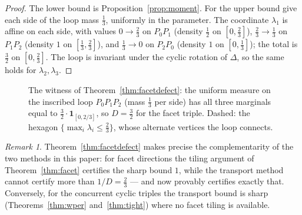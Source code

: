 \documentclass{aims}
\numberwithin{equation}{section}
\theoremstyle{plain}
\theoremstyle{definition}
\theoremstyle{remark}
\newtheorem{remark}[theorem]{Remark}
\begin{document}
\begin{proof}
The lower bound is Proposition~\ref{prop:moment}. For the upper bound give each
side of the loop mass $\tfrac13$, uniformly in the parameter. The coordinate
$\lambda_1$ is affine on each side, with values $0\to\tfrac23$ on $P_0P_1$
(density $\tfrac12$ on $[0,\tfrac23]$), $\tfrac23\to\tfrac13$ on $P_1P_2$
(density $1$ on $[\tfrac13,\tfrac23]$), and $\tfrac13\to0$ on $P_2P_0$ (density
$1$ on $[0,\tfrac13]$); the total is $\tfrac32$ on $[0,\tfrac23]$. The loop is
invariant under the cyclic rotation of $\Delta$, so the same holds for
$\lambda_2,\lambda_3$.
\end{proof}

\begin{figure}[ht]
\centering
{}
\caption{The witness of Theorem~\ref{thm:facetdefect}: the uniform measure on
the inscribed loop $P_0P_1P_2$ (mass $\tfrac13$ per side) has all three
marginals equal to $\tfrac32\cdot\mathbf1_{[0,2/3]}$, so $D=\tfrac32$ for the
facet triple. Dashed: the hexagon $\{\max_i\lambda_i\le\tfrac23\}$, whose
alternate vertices the loop connects.}
\label{fig:loop}
\end{figure}

\begin{remark}\label{rem:complement}
Theorem~\ref{thm:facetdefect} makes precise the complementarity of the two
methods in this paper: for facet directions the tiling argument of
Theorem~\ref{thm:facet} certifies the sharp bound $1$, while the transport
method cannot certify more than $1/D=\tfrac23$ --- and now provably certifies
exactly that. Conversely, for the concurrent cyclic triples the transport bound is
sharp (Theorems~\ref{thm:wper} and~\ref{thm:tight}) where no facet tiling is
available.
\end{remark}
\end{document}
